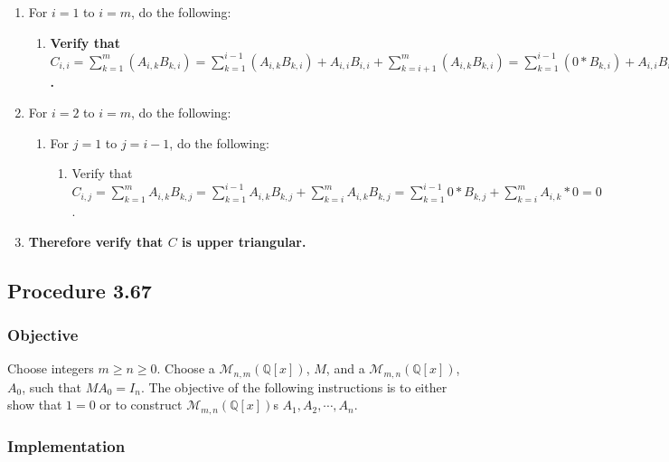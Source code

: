 \documentclass[twocolumn]{article}
\newcommand{\procedure}[2][]{\subsection*{Procedure #2 \ifthenelse{\equal{#1}{}}{}{(#1)}}\label{sec:procedure #2}}
\newcommand{\objective}{\subsubsection*{Objective}}
\newcommand{\implementation}{\subsubsection*{Implementation}}
\begin{document}
				\begin{enumerate}
					\item For $i=1$ to $i=m$, do the following:
					\begin{enumerate}
						\item \textbf{Verify that $C_{i,i}=\sum_{k=1}^m (A_{i,k}B_{k,i})=\sum_{k=1}^{i-1} (A_{i,k}B_{k,i})+A_{i,i}B_{i,i}+\sum_{k=i+1}^m (A_{i,k}B_{k,i})=\sum_{k=1}^{i-1} (0*B_{k,i})+A_{i,i}B_{i,i}+\sum_{k=i+1}^m (A_{i,k}*0)=A_{i,i}B_{i,i}$.}
					\end{enumerate}
					\item For $i=2$ to $i=m$, do the following:
					\begin{enumerate}
						\item For $j=1$ to $j=i-1$, do the following:
						\begin{enumerate}
							\item Verify that $C_{i,j}=\sum_{k=1}^m A_{i,k}B_{k,j}=\sum_{k=1}^{i-1} A_{i,k}B_{k,j}+\sum_{k=i}^m A_{i,k}B_{k,j}=\sum_{k=1}^{i-1} 0*B_{k,j}+\sum_{k=i}^m A_{i,k}*0=0$.
						\end{enumerate}
					\end{enumerate}
					\item \textbf{Therefore verify that $C$ is upper triangular.}
				\end{enumerate}
		\procedure{3.67}
			\objective
				Choose integers $m\ge n\ge 0$. Choose a $\mathcal{M}_{n,m}(\mathbb{Q}[x])$, $M$, and a $\mathcal{M}_{m,n}(\mathbb{Q}[x])$, $A_0$, such that $MA_0=I_n$. The objective of the following instructions is to either show that $1=0$ or to construct $\mathcal{M}_{m,n}(\mathbb{Q}[x])$s $A_1,A_2,\cdots,A_n$.
			\implementation
\end{document}
